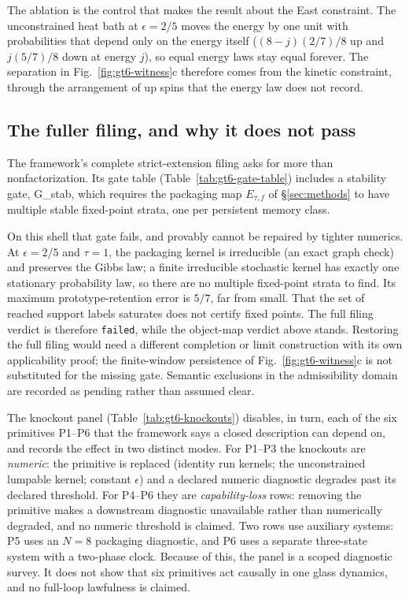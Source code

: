 The ablation is the control that makes the result about the East constraint. The unconstrained
heat bath at $\epsilon=2/5$ moves the energy by one unit with probabilities that depend only on the
energy itself ($(8-j)(2/7)/8$ up and $j(5/7)/8$ down at energy $j$), so equal energy laws stay equal
forever. The separation in Fig.~\ref{fig:gt6-witness}c therefore comes from the kinetic
constraint, through the arrangement of up spins that the energy law does not record.

\subsection{The fuller filing, and why it does not pass}

The framework's complete strict-extension filing asks for more than nonfactorization. Its gate
table (Table~\ref{tab:gt6-gate-table}) includes a stability gate, G\_stab, which requires the
packaging map $E_{\tau,f}$ of \S\ref{sec:methods} to have multiple stable fixed-point strata, one
per persistent memory class.

On this shell that gate fails, and provably cannot be repaired by tighter numerics. At
$\epsilon=2/5$ and $\tau=1$, the packaging kernel is irreducible (an exact graph check) and
preserves the Gibbs law; a finite irreducible stochastic kernel has exactly one stationary
probability law, so there are no multiple fixed-point strata to find. Its maximum
prototype-retention error is $5/7$, far from small. That the set of reached support labels
saturates does not certify fixed points. The full filing verdict is therefore \texttt{failed},
while the object-map verdict above stands. Restoring the full filing would need a different
completion or limit construction with its own applicability proof; the finite-window persistence
of Fig.~\ref{fig:gt6-witness}c is not substituted for the missing gate. Semantic exclusions in the
admissibility domain are recorded as pending rather than assumed clear.



The knockout panel (Table~\ref{tab:gt6-knockouts}) disables, in turn, each of the six primitives
P1--P6 that the framework says a closed description can depend on, and records the effect in two
distinct modes. For P1--P3 the knockouts are \emph{numeric}: the primitive is replaced (identity
run kernels; the unconstrained lumpable kernel; constant $\epsilon$) and a declared numeric
diagnostic degrades past its declared threshold. For P4--P6 they are \emph{capability-loss}
rows: removing the primitive makes a downstream diagnostic unavailable rather than numerically
degraded, and no numeric threshold is claimed. Two rows use auxiliary systems: P5 uses an $N=8$
packaging diagnostic, and P6 uses a separate three-state system with a two-phase clock. Because of
this, the panel is a scoped diagnostic survey. It does not show that six primitives act causally
in one glass dynamics, and no full-loop lawfulness is claimed.

